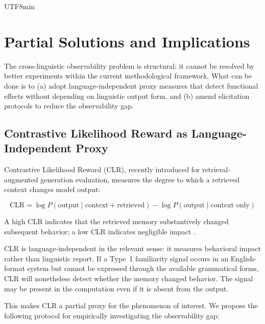 \documentclass[12pt,a4paper]{article}
\begin{document}
\begin{CJK}{UTF8}{min}
\section{Partial Solutions and Implications}

The cross-linguistic observability problem is structural; it cannot be resolved
by better experiments within the current methodological framework. What can be
done is to (a) adopt language-independent proxy measures that detect functional
effects without depending on linguistic output form, and (b) amend elicitation
protocols to reduce the observability gap.

\subsection{Contrastive Likelihood Reward as Language-Independent Proxy}

Contrastive Likelihood Reward (CLR), recently introduced for
retrieval-augmented generation evaluation, measures the degree to which a
retrieved context changes model output:

\begin{equation}
\text{CLR} = \log P(\text{output} \mid \text{context} + \text{retrieved})
  - \log P(\text{output} \mid \text{context only})
\end{equation}

A high CLR indicates that the retrieved memory substantively changed subsequent
behavior; a low CLR indicates negligible impact \citep{tan2026ctrlrag}.

CLR is language-independent in the relevant sense: it measures behavioral impact
rather than linguistic report. If a Type~1 familiarity signal occurs in an
English-format system but cannot be expressed through the available grammatical
forms, CLR will nonetheless detect whether the memory changed behavior. The
signal may be present in the computation even if it is absent from the output.

This makes CLR a partial proxy for the phenomenon of interest. We propose the
following protocol for empirically investigating the observability gap:


\end{CJK}
\end{document}
